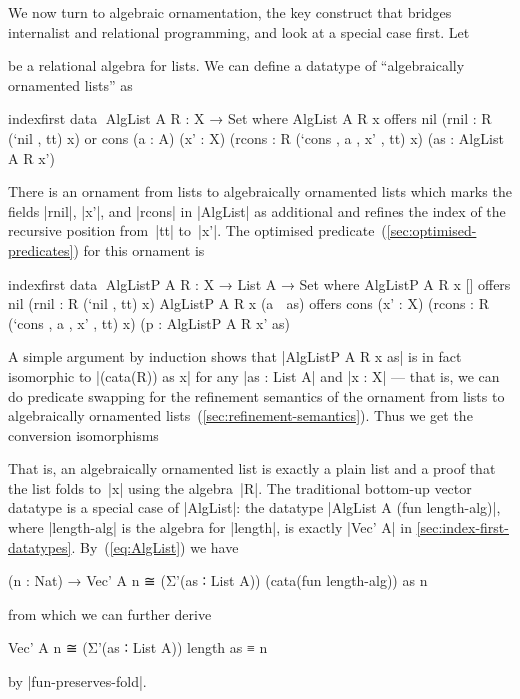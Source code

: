 We now turn to algebraic ornamentation, the key construct that bridges internalist and relational programming, and look at a special case first.
Let
be a relational algebra for lists.
We can define a datatype of ``algebraically ornamented lists'' as
\begin{code}
indexfirst data ^^^AlgList A R : X → Set where
  AlgList A R x  offers  nil (rnil : R (`nil , tt) x)
                 or      cons  (a : A) (x' : X) (rcons : R (`cons , a , x' , tt) x)
                               (as : AlgList A R x')
\end{code}
There is an ornament from lists to algebraically ornamented lists which marks the fields |rnil|, |x'|, and |rcons| in |AlgList| as additional and refines the index of the recursive position from~|tt| to~|x'|.
The optimised predicate~(\autoref{sec:optimised-predicates}) for this ornament is
\begin{code}
indexfirst data ^^^AlgListP A R : X → List A → Set where
  AlgListP A R x []        offers  nil (rnil : R (`nil , tt) x)
  AlgListP A R x (a ∷ as)  offers  cons  (x' : X) (rcons : R (`cons , a , x' , tt) x)
                                         (p : AlgListP A R x' as)
\end{code}
A simple argument by induction shows that |AlgListP A R x as| is in fact isomorphic to |(cata(R)) as x| for any |as : List A| and |x : X| --- that is, we can do predicate swapping for the refinement semantics of the ornament from lists to algebraically ornamented lists~(\autoref{sec:refinement-semantics}).
Thus we get the conversion isomorphisms
That is, an algebraically ornamented list is exactly a plain list and a proof that the list folds to~|x| using the algebra~|R|.
The traditional bottom-up vector datatype is a special case of |AlgList|: the datatype |AlgList A (fun length-alg)|, where |length-alg| is the algebra for |length|, is exactly |Vec' A| in \autoref{sec:index-first-datatypes}.
By~(\ref{eq:AlgList}) we have
\begin{code}
(n : Nat) → Vec' A n ≅ (Σ'(as ∶ List A)) (cata(fun length-alg)) as n
\end{code}
from which we can further derive
\begin{code}
Vec' A n ≅ (Σ'(as ∶ List A)) length as ≡ n
\end{code}
by |fun-preserves-fold|.

